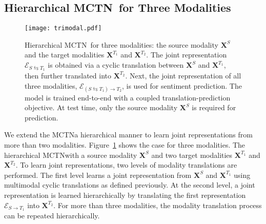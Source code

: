 \documentclass[letterpaper]{article} %
\newcommand{\ours}{MCTN}
\begin{document}
\subsection{Hierarchical \ours \ for Three Modalities}

\begin{figure}[tbp]
\centering
\texttt{[image: trimodal.pdf]}
\caption{
\small
{
Hierarchical \ours \ for three modalities: the source modality $\mathbf{X}^{S}$ and the target modalities $\mathbf{X}^{T_1}$ and $\mathbf{X}^{T_2}$. The joint representation ${\mathcal{E}}_{S \leftrightarrows T_1}$ is obtained via a cyclic translation between $\mathbf{X}^{S}$ and $\mathbf{X}^{T_1}$, then further translated into $\mathbf{X}^{T_2}$. Next, the joint representation of all three modalities, ${\mathcal{E}}_{(S \leftrightarrows T_1) \rightarrow T_2}$, is used for sentiment prediction. The model is trained end-to-end with a coupled translation-prediction objective. At test time, only the source modality $\mathbf{X}^{S}$ is required for prediction.}
}
\label{fig:h_s2s}
\end{figure}


We extend the \ours \in a hierarchical manner to learn joint representations from more than two modalities. Figure~\ref{fig:h_s2s} shows the case for three modalities. The hierarchical \ours \starts with a source modality $\mathbf{X}^{S}$ and two target modalities $\mathbf{X}^{T_1}$ and $\mathbf{X}^{T_2}$. To learn joint representations, two levels of modality translations are performed. The first level learns a joint representation from $\mathbf{X}^{S}$ and $\mathbf{X}^{T_1}$ using multimodal cyclic translations as defined previously. At the second level, a joint representation is learned hierarchically by translating the first representation $\mathcal{E}_{S \rightarrow T_1}$ into $\mathbf{X}^{T_2}$. For more than three modalities, the modality translation process can be repeated hierarchically.
\end{document}
